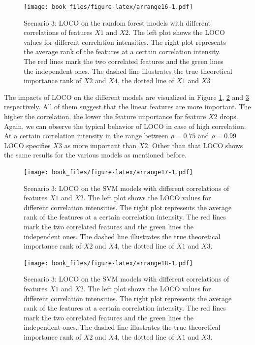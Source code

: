\documentclass[
]{krantz}
\begin{document}
\begin{figure}
\centering
\texttt{[image: book\_files/figure-latex/arrange16-1.pdf]}
\caption{\label{fig:arrange16}Scenario 3: LOCO on the random forest models with different correlations of features \(X1\) and \(X2\). The left plot shows the LOCO values for different correlation intensities. The right plot represents the average rank of the features at a certain correlation intensity. The red lines mark the two correlated features and the green lines the independent ones. The dashed line illustrates the true theoretical importance rank of \(X2\) and \(X4\), the dotted line of \(X1\) and \(X3\)}
\end{figure}

The impacts of LOCO on the different models are visualized in Figure \ref{fig:arrange16}, \ref{fig:arrange17} and \ref{fig:arrange18} respectively. All of them suggest that the linear features are more important. The higher the correlation, the lower the feature importance for feature \(X2\) drops. Again, we can observe the typical behavior of LOCO in case of high correlation. At a certain correlation intensity in the range between \(\rho=0.75\) and \(\rho=0.99\) LOCO specifies \(X3\) as more important than \(X2\). Other than that LOCO shows the same results for the various models as mentioned before.

\begin{figure}
\centering
\texttt{[image: book\_files/figure-latex/arrange17-1.pdf]}
\caption{\label{fig:arrange17}Scenario 3: LOCO on the SVM models with different correlations of features \(X1\) and \(X2\). The left plot shows the LOCO values for different correlation intensities. The right plot represents the average rank of the features at a certain correlation intensity. The red lines mark the two correlated features and the green lines the independent ones. The dashed line illustrates the true theoretical importance rank of \(X2\) and \(X4\), the dotted line of \(X1\) and \(X3\).}
\end{figure}

\begin{figure}
\centering
\texttt{[image: book\_files/figure-latex/arrange18-1.pdf]}
\caption{\label{fig:arrange18}Scenario 3: LOCO on the SVM models with different correlations of features \(X1\) and \(X2\). The left plot shows the LOCO values for different correlation intensities. The right plot represents the average rank of the features at a certain correlation intensity. The red lines mark the two correlated features and the green lines the independent ones. The dashed line illustrates the true theoretical importance rank of \(X2\) and \(X4\), the dotted line of \(X1\) and \(X3\).}
\end{figure}
\end{document}

